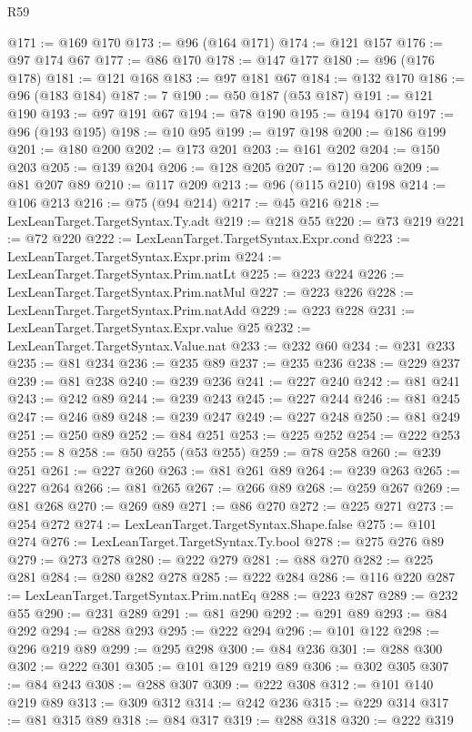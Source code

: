\begin{lexlean}{R59}
\begin{coremodule}
@171 := @169 @170
@173 := @96 (@164 @171)
@174 := @121 @157
@176 := @97 @174 @67
@177 := @86 @170
@178 := @147 @177
@180 := @96 (@176 @178)
@181 := @121 @168
@183 := @97 @181 @67
@184 := @132 @170
@186 := @96 (@183 @184)
@187 := 7
@190 := @50 @187 (@53 @187)
@191 := @121 @190
@193 := @97 @191 @67
@194 := @78 @190
@195 := @194 @170
@197 := @96 (@193 @195)
@198 := @10 @95
@199 := @197 @198
@200 := @186 @199
@201 := @180 @200
@202 := @173 @201
@203 := @161 @202
@204 := @150 @203
@205 := @139 @204
@206 := @128 @205
@207 := @120 @206
@209 := @81 @207 @89
@210 := @117 @209
@213 := @96 (@115 @210) @198
@214 := @106 @213
@216 := @75 (@94 @214)
@217 := @45 @216
@218 := LexLeanTarget.TargetSyntax.Ty.adt
@219 := @218 @55
@220 := @73 @219
@221 := @72 @220
@222 := LexLeanTarget.TargetSyntax.Expr.cond
@223 := LexLeanTarget.TargetSyntax.Expr.prim
@224 := LexLeanTarget.TargetSyntax.Prim.natLt
@225 := @223 @224
@226 := LexLeanTarget.TargetSyntax.Prim.natMul
@227 := @223 @226
@228 := LexLeanTarget.TargetSyntax.Prim.natAdd
@229 := @223 @228
@231 := LexLeanTarget.TargetSyntax.Expr.value @25
@232 := LexLeanTarget.TargetSyntax.Value.nat
@233 := @232 @60
@234 := @231 @233
@235 := @81 @234
@236 := @235 @89
@237 := @235 @236
@238 := @229 @237
@239 := @81 @238
@240 := @239 @236
@241 := @227 @240
@242 := @81 @241
@243 := @242 @89
@244 := @239 @243
@245 := @227 @244
@246 := @81 @245
@247 := @246 @89
@248 := @239 @247
@249 := @227 @248
@250 := @81 @249
@251 := @250 @89
@252 := @84 @251
@253 := @225 @252
@254 := @222 @253
@255 := 8
@258 := @50 @255 (@53 @255)
@259 := @78 @258
@260 := @239 @251
@261 := @227 @260
@263 := @81 @261 @89
@264 := @239 @263
@265 := @227 @264
@266 := @81 @265
@267 := @266 @89
@268 := @259 @267
@269 := @81 @268
@270 := @269 @89
@271 := @86 @270
@272 := @225 @271
@273 := @254 @272
@274 := LexLeanTarget.TargetSyntax.Shape.false
@275 := @101 @274
@276 := LexLeanTarget.TargetSyntax.Ty.bool
@278 := @275 @276 @89
@279 := @273 @278
@280 := @222 @279
@281 := @88 @270
@282 := @225 @281
@284 := @280 @282 @278
@285 := @222 @284
@286 := @116 @220
@287 := LexLeanTarget.TargetSyntax.Prim.natEq
@288 := @223 @287
@289 := @232 @55
@290 := @231 @289
@291 := @81 @290
@292 := @291 @89
@293 := @84 @292
@294 := @288 @293
@295 := @222 @294
@296 := @101 @122
@298 := @296 @219 @89
@299 := @295 @298
@300 := @84 @236
@301 := @288 @300
@302 := @222 @301
@305 := @101 @129 @219 @89
@306 := @302 @305
@307 := @84 @243
@308 := @288 @307
@309 := @222 @308
@312 := @101 @140 @219 @89
@313 := @309 @312
@314 := @242 @236
@315 := @229 @314
@317 := @81 @315 @89
@318 := @84 @317
@319 := @288 @318
@320 := @222 @319

\end{coremodule}
\end{lexlean}

